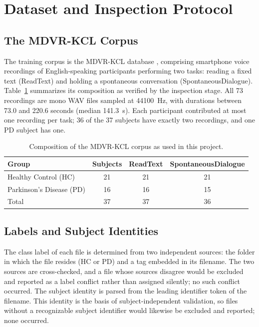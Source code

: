 \section{Dataset and Inspection Protocol}

\subsection{The MDVR-KCL Corpus}

The training corpus is the MDVR-KCL database \cite{jaeger2019},
comprising smartphone voice recordings of English-speaking participants
performing two tasks: reading a fixed text (ReadText) and holding a
spontaneous conversation (SpontaneousDialogue). Table~\ref{tab:dataset}
summarizes its composition as verified by the inspection stage. All
73 recordings are mono WAV files sampled at 44100~Hz, with durations
between 73.0 and 220.6 seconds (median 141.3~s). Each participant
contributed at most one recording per task; 36 of the 37 subjects have
exactly two recordings, and one PD subject has one.

\begin{table}[htb]
\centering
\caption{Composition of the MDVR-KCL corpus as used in this project.}
\label{tab:dataset}
\begin{tabular}{lccc}
\toprule
Group & Subjects & ReadText & SpontaneousDialogue \\
\midrule
Healthy Control (HC) & 21 & 21 & 21 \\
Parkinson's Disease (PD) & 16 & 16 & 15 \\
\midrule
Total & 37 & 37 & 36 \\
\bottomrule
\end{tabular}
\end{table}

\subsection{Labels and Subject Identities}

The class label of each file is determined from two independent
sources: the folder in which the file resides (HC or PD) and a tag
embedded in its filename. The two sources are cross-checked, and a file
whose sources disagree would be excluded and reported as a label
conflict rather than assigned silently; no such conflict occurred. The
subject identity is parsed from the leading identifier token of the
filename. This identity is the basis of subject-independent validation,
so files without a recognizable subject identifier would likewise be
excluded and reported; none occurred.

